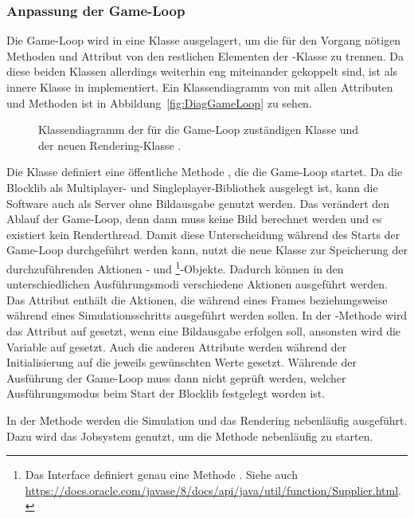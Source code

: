 \subsubsection{Anpassung der Game-Loop}\label{sec:adjustGameLoop}
Die Game-Loop wird in eine Klasse  ausgelagert, um die für den Vorgang nötigen Methoden und Attribut von den restlichen Elementen der -Klasse zu trennen. Da diese beiden Klassen allerdings weiterhin eng miteinander gekoppelt sind, ist  als innere Klasse in  implementiert. Ein Klassendiagramm von   mit allen Attributen und Methoden ist in Abbildung~\vref{fig:DiagGameLoop} zu sehen.
\begin{figure}[htbp]
	\centering
	
	\caption[Klassendiagramm von  und .]{Klassendiagramm der für die Game-Loop zuständigen Klasse  und der neuen Rendering-Klasse .}\label{fig:DiagGameLoop}
\end{figure}
Die Klasse definiert eine öffentliche Methode , die die Game-Loop startet. Da die Blocklib als Multiplayer- und Singleplayer-Bibliothek ausgelegt ist, kann die Software auch als Server ohne Bildausgabe genutzt werden. Das verändert den Ablauf der Game-Loop, denn dann muss keine Bild berechnet werden und es existiert kein Renderthread. Damit diese Unterscheidung während des Starts der Game-Loop durchgeführt werden kann, nutzt die neue Klasse  zur Speicherung der durchzuführenden Aktionen - und \footnote{Das Interface  definiert genau eine Methode . Siehe auch \url{https://docs.oracle.com/javase/8/docs/api/java/util/function/Supplier.html}.}-Objekte. Dadurch können in den unterschiedlichen Ausführungsmodi verschiedene Aktionen ausgeführt werden. Das Attribut  enthält die Aktionen, die während eines Frames beziehungsweise während eines Simulationsschritts ausgeführt werden sollen. In der -Methode wird das Attribut auf  gesetzt, wenn eine Bildausgabe erfolgen soll, ansonsten wird die Variable auf  gesetzt. Auch die anderen Attribute werden während der Initialisierung auf die jeweils gewünschten Werte gesetzt. Währende der Ausführung der Game-Loop muss dann nicht geprüft werden, welcher Ausführungsmodus beim Start der Blocklib festgelegt worden ist.

In der Methode  werden die Simulation und das Rendering nebenläufig ausgeführt. Dazu wird das Jobsystem genutzt, um die Methode  nebenläufig zu starten. 

